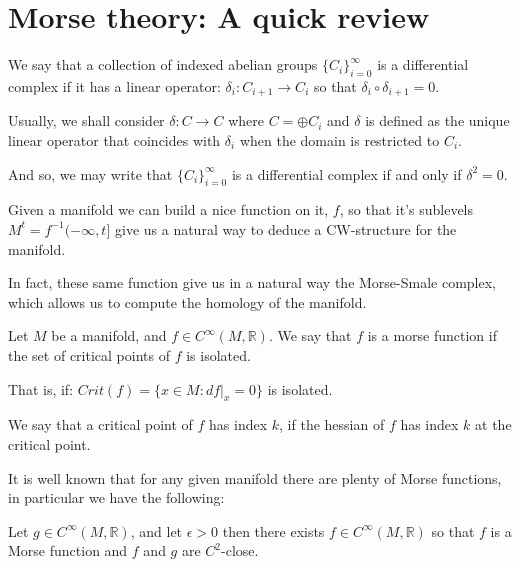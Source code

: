 \newcommand{\R}{\mathbb{R}}


\chapter{Morse theory: A quick review}

\begin{definition}
We say that a collection of indexed abelian groups
$\{C_i\}_{i=0}^{\infty}$ is a differential complex if
it has a linear operator:
$\delta_i: C_{i+1}\to C_i$
so that $\delta_i\circ\delta_{i+1}=0$.

Usually, we shall consider $\delta: C\to C$ where $C=\oplus C_i$
and $\delta$ is defined as the unique linear operator that coincides with $\delta_i$
when the domain is restricted to $C_i$.

And so, we may write that $\{C_i\}_{i=0}^{\infty}$ 
is a differential complex if and only if $\delta^2=0$.
\end{definition}

Given a manifold we can build a nice function on it, $f$,
so that it's sublevels $M^t=f^{-1}(-\infty,t]$ give us a natural way to 
deduce a CW-structure for the manifold.

In fact, these same function give us in a natural way the Morse-Smale complex,
which allows us to compute the homology of the manifold.

\begin{definition}

Let $M$ be a manifold, and $f\in C^\infty(M,\mathbb{R})$.
We say that $f$ is a morse function if the set of critical points
of $f$ is isolated. 

That is, if:
$
Crit(f)=\{x\in M: df\vert_x=0
\}
$
is isolated.

\end{definition}

We say that a critical point of $f$ has index $k$,
if the hessian of $f$ has index $k$ at the critical point.

It is well known that for any given manifold there are plenty of Morse functions,
in particular we have the following:


\begin{theorem}
\cite{mat1997}
Let $g\in C^\infty(M,\mathbb{R})$, and let $\epsilon>0$
then there exists $f\in C^\infty(M,\mathbb{R})$ so that $f$
is a Morse function and $f$ and $g$ are $C^2$-close.
\end{theorem}

